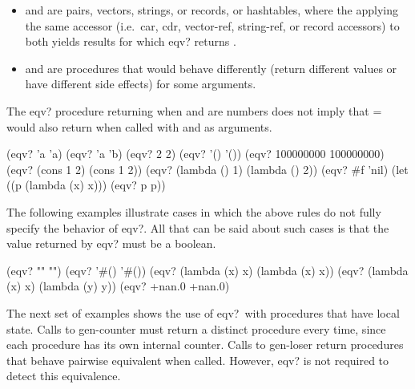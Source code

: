 \begin{entry}{%
}
\begin{itemize}
\item {} and  are pairs, vectors, strings, or
  records, or hashtables, where the applying the same accessor (i.e.\
  {\cf car}, {\cf cdr}, {\cf vector-ref}, {\cf string-ref}, or record
  accessors) to both yields results for which {\cf eqv?} returns
  \schfalse.

\item {} and  are procedures that would behave differently
(return different values or have different side effects) for some arguments.

\end{itemize}

\begin{note}
  The {\cf eqv?} procedure returning \schtrue{} when  and
   are numbers does not imply that {\cf =} would also
  return \schtrue{} when called with \vari{obj} and \varii{obj} as
  arguments.
\end{note}


\begin{scheme}
(eqv? 'a 'a)                     \ev  \schtrue
(eqv? 'a 'b)                     \ev  \schfalse
(eqv? 2 2)                       \ev  \schtrue
(eqv? '() '())                   \ev  \schtrue
(eqv? 100000000 100000000)       \ev  \schtrue
(eqv? (cons 1 2) (cons 1 2))     \ev  \schfalse
(eqv? (lambda () 1)
      (lambda () 2))             \ev  \schfalse
(eqv? \#f 'nil)                  \ev  \schfalse
(let ((p (lambda (x) x)))
  (eqv? p p))                    \ev  \unspecified%
\end{scheme}

The following examples illustrate cases in which the above rules do
not fully specify the behavior of {\cf eqv?}.  All that can be said
about such cases is that the value returned by {\cf eqv?} must be a
boolean.

\begin{scheme}
(eqv? "" "")             \ev  \unspecified
(eqv? '\#() '\#())         \ev  \unspecified
(eqv? (lambda (x) x)
      (lambda (x) x))    \ev  \unspecified
(eqv? (lambda (x) x)
      (lambda (y) y))    \ev  \unspecified
(eqv? +nan.0 +nan.0)             \ev \unspecified%
\end{scheme}

The next set of examples shows the use of {\cf eqv?}\ with procedures
that have local state.  Calls to {\cf gen-counter} must return a
distinct procedure every time, since each procedure has its own
internal counter.  Calls to {\cf gen-loser} return procedures that
behave pairwise equivalent when called.  However, {\cf eqv?} is not
required to detect this equivalence.


\end{entry}
